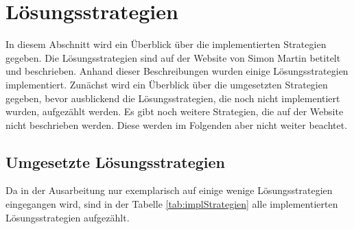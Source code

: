 \section{Lösungsstrategien}

In diesem Abschnitt wird ein Überblick über die implementierten Strategien gegeben. Die Lösungsstrategien sind auf der Website von Simon Martin \cite{martin} betitelt und beschrieben. Anhand dieser Beschreibungen wurden einige Lösungsstrategien implementiert. Zunächst wird ein Überblick über die umgesetzten Strategien gegeben, bevor ausblickend die Lösungsstrategien, die noch nicht implementiert wurden, aufgezählt werden. Es gibt noch weitere Strategien, die auf der Website nicht beschrieben werden. Diese werden im Folgenden aber nicht weiter beachtet.

\subsection{Umgesetzte Lösungsstrategien}
Da in der Ausarbeitung nur exemplarisch auf einige wenige Lösungsstrategien eingegangen wird, sind in der Tabelle \ref{tab:implStrategien} alle implementierten Lösungsstrategien aufgezählt.
